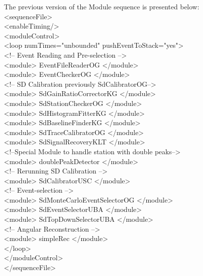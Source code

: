 The previous version of the Module sequence is presented below:
\begingroup
  \selectfont \\ 
  \noindent <sequenceFile>\\
  \null\quad <enableTiming/>\\
  \null\quad <moduleControl>\\
  \null\qquad <loop numTimes="unbounded" pushEventToStack="yes"> \\
    \null\qquad \quad  <!-- Event Reading and Pre-selection -->\\
    \null\qquad \quad  <module> EventFileReaderOG </module>\\
    \null \qquad \quad  <module> EventCheckerOG </module>\\
    \null\qquad \quad  <!-- SD Calibration previously SdCalibratorOG-->\\
    \null\qquad \quad   <module> SdGainRatioCorrectorKG </module>\\
    \null\qquad \quad   <module> SdStationCheckerOG </module>\\
    \null\qquad \quad   <module> SdHistogramFitterKG </module>\\
    \null\qquad \quad   <module> SdBaselineFinderKG </module>\\
    \null\qquad \quad   <module> SdTraceCalibratorOG </module>\\
    \null\qquad \quad   <module> SdSignalRecoveryKLT </module>\\
    \null\qquad \quad  <!--Special Module to handle station with double peaks-->\\
    \null\qquad \quad   <module> doublePeakDetector </module>\\
    \null\qquad \quad  <!-- Rerunning SD Calibration -->\\
    \null\qquad \quad   <module> SdCalibratorUSC </module>\\
    \null\qquad \quad  <!-- Event-selection -->\\
    \null\qquad \quad   <module> SdMonteCarloEventSelectorOG </module>\\
    \null\qquad \quad   <module> SdEventSelectorUBA </module>\\
    \null\qquad \quad   <module> SdTopDownSelectorUBA </module>\\
    \null\qquad \quad  <!-- Angular Reconstruction -->\\
    \null\qquad \quad   <module> simpleRec </module>\\
  \null \qquad  </loop>\\
  \null \quad  </moduleControl>\\
   </sequenceFile>\\
\endgroup

